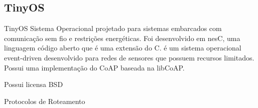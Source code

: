 \subsection{TinyOS}
TinyOS Sistema Operacional projetado para sistemas embarcados com comunica\c{c}\~ao sem fio e restri\c{c}\~oes energ\'eticas. Foi desenvolvido em nesC, uma linguagem c\'odigo aberto que \'e uma extens\~ao do C. \'e um sistema operacional event-driven desenvolvido para redes de sensores que possuem recursos limitados. Possui uma implementa\c{c}\~ao do CoAP baseada na libCoAP.

Possui licensa BSD

Protocolos de Roteamento
